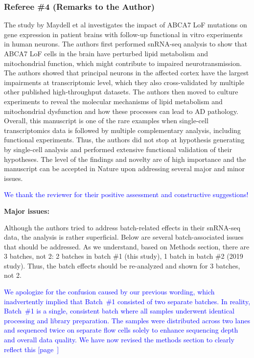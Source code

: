 \subsubsection*{Referee \#4 (Remarks to the Author)}

The study by Maydell et al investigates the impact of ABCA7 LoF mutations on gene expression in patient brains with follow-up functional in vitro experiments in human neurons. The authors first performed snRNA-seq analysis to show that ABCA7 LoF cells in the brain have perturbed lipid metabolism and mitochondrial function, which might contribute to impaired neurotransmission. The authors showed that principal neurons in the affected cortex have the largest impairments at transcriptomic level, which they also cross-validated by multiple other published high-throughput datasets. The authors then moved to culture experiments to reveal the molecular mechanisms of lipid metabolism and mitochondrial dysfunction and how these processes can lead to AD pathology. Overall, this manuscript is one of the rare examples when single-cell transcriptomics data is followed by multiple complementary analysis, including functional experiments. Thus, the authors did not stop at hypothesis generating by single-cell analysis and performed extensive functional validation of their hypotheses. The level of the findings and novelty are of high importance and the manuscript can be accepted in Nature upon addressing several major and minor issues.

\textcolor{blue}{We thank the reviewer for their positive assessment and constructive suggestions!}

\textbf{Major issues:}

Although the authors tried to address batch-related effects in their snRNA-seq data, the analysis is rather superficial. Below are several batch-associated issues that should be addressed. As we understand, based on Methods section, there are 3 batches, not 2: 2 batches in batch \#1 (this study), 1 batch in batch \#2 (2019 study). Thus, the batch effects should be re-analyzed and shown for 3 batches, not 2.

\textcolor{blue}{We apologize for the confusion caused by our previous wording, which inadvertently implied that Batch \#1 consisted of two separate batches. In reality, Batch \#1 is a single, consistent batch where all samples underwent identical processing and library preparation. The samples were distributed across two lanes and sequenced twice on separate flow cells solely to enhance sequencing depth and overall data quality. We have now revised the methods section to clearly reflect this [page~\pageref{quoteJ-label}]}

